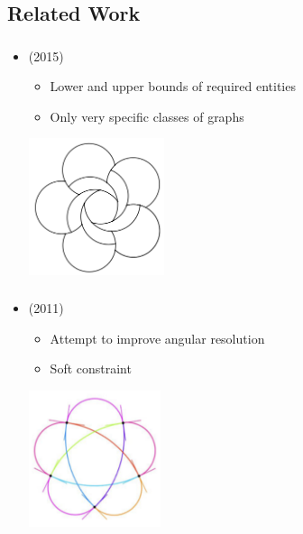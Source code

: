 \subsection{Related Work}
\label{subsect:related-work}

\begin{frame}
  \frametitle{\insertsubsection}
  \begin{itemize}
    \item {} (2015) \begin{itemize}
      \item Lower and upper bounds of required entities
      \item Only very specific classes of graphs
    \end{itemize}
    \vspace{0.5cm}
    \centering
    \includegraphics[height=4cm,natwidth=620,natheight=626]{Resources/Schulz.png}
  \end{itemize}
\end{frame}

\begin{frame}
  \frametitle{\insertsubsection}
  \begin{itemize}
    \item {} (2011) \begin{itemize}
      \item Attempt to improve angular resolution
      \item Soft constraint
    \end{itemize}
    \vspace{0.5cm}
    \centering
    \includegraphics[height=4cm,natwidth=610,natheight=632]{Resources/Lombardi.png}
  \end{itemize}
\end{frame}

